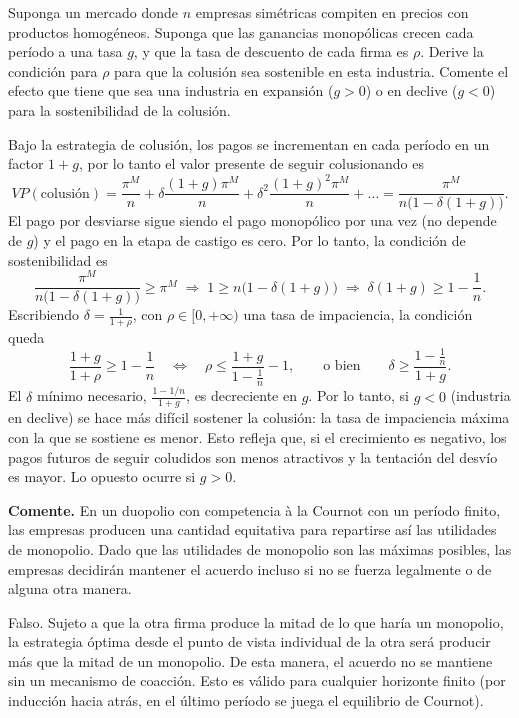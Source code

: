 \question Suponga un mercado donde $n$ empresas simétricas compiten en precios con productos homogéneos. Suponga que las ganancias monopólicas crecen cada período a una tasa $g$, y que la tasa de descuento de cada firma es $\rho$. Derive la condición para $\rho$ para que la colusión sea sostenible en esta industria. Comente el efecto que tiene que sea una industria en expansión ($g>0$) o en declive ($g<0$) para la sostenibilidad de la colusión.
\begin{solution}
Bajo la estrategia de colusión, los pagos se incrementan en cada período en un factor $1+g$, por lo tanto el valor presente de seguir colusionando es
\[
  VP(\text{colusión}) = \frac{\pi^M}{n} + \delta\frac{(1+g)\pi^M}{n} + \delta^2\frac{(1+g)^2\pi^M}{n} + \dots = \frac{\pi^M}{n\bigl(1 - \delta(1+g)\bigr)} .
\]
El pago por desviarse sigue siendo el pago monopólico por una vez (no depende de $g$) y el pago en la etapa de castigo es cero. Por lo tanto, la condición de sostenibilidad es
\[
  \frac{\pi^M}{n\bigl(1-\delta(1+g)\bigr)} \geq \pi^M
  \;\Longrightarrow\;
  1 \geq n\bigl(1-\delta(1+g)\bigr)
  \;\Longrightarrow\;
  \delta(1+g) \geq 1 - \frac{1}{n}.
\]
Escribiendo $\delta = \frac{1}{1+\rho}$, con $\rho \in [0,+\infty)$ una tasa de impaciencia, la condición queda
\[
  \frac{1+g}{1+\rho} \geq 1 - \frac{1}{n}
  \quad\Longleftrightarrow\quad
  \rho \leq \frac{1+g}{1-\frac{1}{n}} - 1,
  \qquad \text{o bien} \qquad
  \delta \geq \frac{1-\frac{1}{n}}{1+g}.
\]
El $\delta$ mínimo necesario, $\frac{1-1/n}{1+g}$, es decreciente en $g$. Por lo tanto, si $g<0$ (industria en declive) se hace más difícil sostener la colusión: la tasa de impaciencia máxima con la que se sostiene es menor. Esto refleja que, si el crecimiento es negativo, los pagos futuros de seguir coludidos son menos atractivos y la tentación del desvío es mayor. Lo opuesto ocurre si $g>0$.

\end{solution}

\question \textbf{Comente.} En un duopolio con competencia à la Cournot con un período finito, las empresas producen una cantidad equitativa para repartirse así las utilidades de monopolio. Dado que las utilidades de monopolio son las máximas posibles, las empresas decidirán mantener el acuerdo incluso si no se fuerza legalmente o de alguna otra manera.
\begin{solution}
Falso. Sujeto a que la otra firma produce la mitad de lo que haría un monopolio, la estrategia óptima desde el punto de vista individual de la otra será producir más que la mitad de un monopolio. De esta manera, el acuerdo no se mantiene sin un mecanismo de coacción. Esto es válido para cualquier horizonte finito (por inducción hacia atrás, en el último período se juega el equilibrio de Cournot).

\end{solution}

